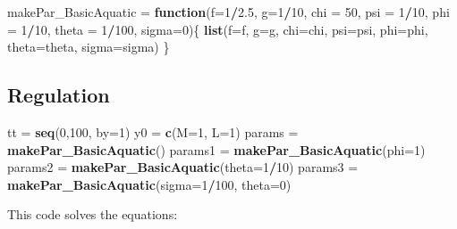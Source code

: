 \documentclass[
]{book}
\newenvironment{Shaded}{\begin{snugshade}}{\end{snugshade}}
\newcommand{\AttributeTok}[1]{\textcolor[rgb]{0.13,0.29,0.53}{#1}}
\newcommand{\ControlFlowTok}[1]{\textcolor[rgb]{0.13,0.29,0.53}{\textbf{#1}}}
\newcommand{\DecValTok}[1]{\textcolor[rgb]{0.00,0.00,0.81}{#1}}
\newcommand{\FloatTok}[1]{\textcolor[rgb]{0.00,0.00,0.81}{#1}}
\newcommand{\FunctionTok}[1]{\textcolor[rgb]{0.13,0.29,0.53}{\textbf{#1}}}
\newcommand{\NormalTok}[1]{#1}
\newcommand{\OtherTok}[1]{\textcolor[rgb]{0.56,0.35,0.01}{#1}}
\newcommand{\SpecialCharTok}[1]{\textcolor[rgb]{0.81,0.36,0.00}{\textbf{#1}}}
\begin{document}
\begin{Shaded}
\begin{Highlighting}[]
\NormalTok{makePar\_BasicAquatic }\OtherTok{=} \ControlFlowTok{function}\NormalTok{(}\AttributeTok{f=}\DecValTok{1}\SpecialCharTok{/}\FloatTok{2.5}\NormalTok{, }\AttributeTok{g=}\DecValTok{1}\SpecialCharTok{/}\DecValTok{10}\NormalTok{, }\AttributeTok{chi =} \DecValTok{50}\NormalTok{, }\AttributeTok{psi =} \DecValTok{1}\SpecialCharTok{/}\DecValTok{10}\NormalTok{, }\AttributeTok{phi =} \DecValTok{1}\SpecialCharTok{/}\DecValTok{10}\NormalTok{, }\AttributeTok{theta =} \DecValTok{1}\SpecialCharTok{/}\DecValTok{100}\NormalTok{, }\AttributeTok{sigma=}\DecValTok{0}\NormalTok{)\{}
  \FunctionTok{list}\NormalTok{(}\AttributeTok{f=}\NormalTok{f, }\AttributeTok{g=}\NormalTok{g, }\AttributeTok{chi=}\NormalTok{chi, }\AttributeTok{psi=}\NormalTok{psi, }\AttributeTok{phi=}\NormalTok{phi, }\AttributeTok{theta=}\NormalTok{theta, }\AttributeTok{sigma=}\NormalTok{sigma)}
\NormalTok{\}}
\end{Highlighting}
\end{Shaded}

\hypertarget{regulation-1}{%
\subsection{Regulation}\label{regulation-1}}

\begin{Shaded}
\begin{Highlighting}[]
\NormalTok{tt }\OtherTok{=} \FunctionTok{seq}\NormalTok{(}\DecValTok{0}\NormalTok{,}\DecValTok{100}\NormalTok{, }\AttributeTok{by=}\DecValTok{1}\NormalTok{) }
\NormalTok{y0 }\OtherTok{=} \FunctionTok{c}\NormalTok{(}\AttributeTok{M=}\DecValTok{1}\NormalTok{, }\AttributeTok{L=}\DecValTok{1}\NormalTok{)}
\NormalTok{params }\OtherTok{=} \FunctionTok{makePar\_BasicAquatic}\NormalTok{()}
\NormalTok{params1 }\OtherTok{=} \FunctionTok{makePar\_BasicAquatic}\NormalTok{(}\AttributeTok{phi=}\DecValTok{1}\NormalTok{)}
\NormalTok{params2 }\OtherTok{=} \FunctionTok{makePar\_BasicAquatic}\NormalTok{(}\AttributeTok{theta=}\DecValTok{1}\SpecialCharTok{/}\DecValTok{10}\NormalTok{)}
\NormalTok{params3 }\OtherTok{=} \FunctionTok{makePar\_BasicAquatic}\NormalTok{(}\AttributeTok{sigma=}\DecValTok{1}\SpecialCharTok{/}\DecValTok{100}\NormalTok{, }\AttributeTok{theta=}\DecValTok{0}\NormalTok{)}
\end{Highlighting}
\end{Shaded}

This code solves the equations:
\end{document}
